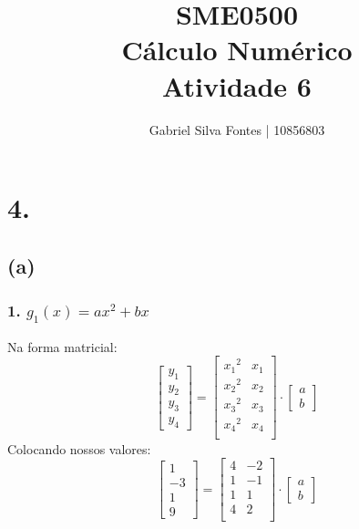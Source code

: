 \documentclass[12pt]{article}
\title{SME0500 \\ Cálculo Numérico \\ Atividade 6}
\author{Gabriel Silva Fontes | 10856803}
\begin{document}
\maketitle


\section*{4.}

\subsection*{(a)}

\subsubsection*{1. \(g_1(x) = ax^2+bx\)}

Na forma matricial:
\[
\begin{bmatrix}
    y_1 \\
    y_2 \\
    y_3 \\
    y_4
\end{bmatrix}
=
\begin{bmatrix}
    {x_1}^2 & x_1 \\
    {x_2}^2 & x_2 \\
    {x_3}^2 & x_3 \\
    {x_4}^2 & x_4 \\
\end{bmatrix}
\cdot
\begin{bmatrix}
    a \\
    b
\end{bmatrix}
\]
Colocando nossos valores:
\[
\begin{bmatrix}
    1 \\
    -3 \\
    1 \\
    9
\end{bmatrix}
=
\begin{bmatrix}
    4 & -2 \\
    1 & -1 \\
    1 & 1 \\
    4 & 2 \\
\end{bmatrix}
\cdot
\begin{bmatrix}
    a \\
    b
\end{bmatrix}
\]
\end{document}
